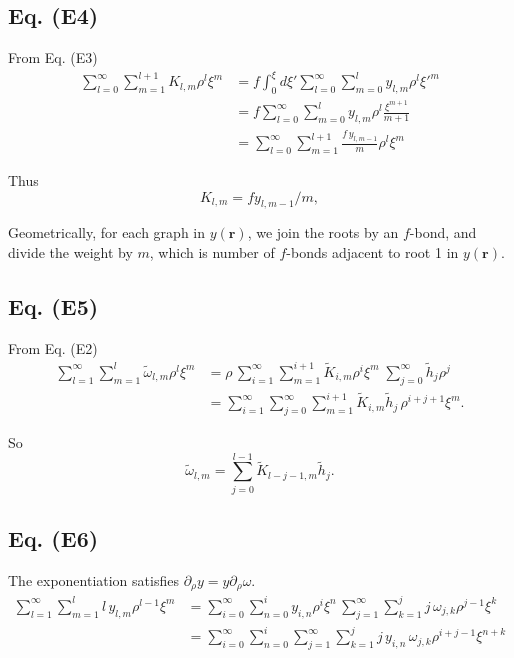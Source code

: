 \documentclass[preprint]{revtex4-1}
\numberwithin{equation}{subsection}
\numberwithin{table}{section}
\newcommand{\vct}[1]{\mathbf{#1}}
\providecommand{\vr}{} %
\renewcommand{\vr}{\vct{r}}
\begin{document}
\subsection{Eq. (E4)}

From Eq. (E3)
\begin{align*}
  \sum_{l=0}^\infty
  \sum_{m=1}^{l+1}
  K_{l,m} \rho^l \xi^m
&=
  f
  \int_0^\xi d\xi'
  \sum_{l=0}^\infty
  \sum_{m=0}^l
  y_{l,m} \rho^l {\xi'}^m
\\
&=
  f
  \sum_{l=0}^\infty
  \sum_{m=0}^l
  y_{l,m} \rho^l \frac{ \xi^{m+1} }{m+1}
\\
&=
  \sum_{l=0}^\infty
  \sum_{m=1}^{l+1}
  \frac{ f \, y_{l,m-1} }{m} \rho^l \xi^{m}
\end{align*}

Thus
\[
  K_{l,m} = f y_{l, m-1}/m,
\]


Geometrically, for each graph in $y(\vr)$,
we join the roots by an $f$-bond,
and divide the weight by $m$,
which is number of $f$-bonds adjacent to root 1
in $y(\vr)$.



\subsection{Eq. (E5)}

From Eq. (E2)
\begin{align*}
  \sum_{l=1}^\infty
  \sum_{m=1}^{l}
  \tilde\omega_{l,m} \rho^l \xi^m
&=
  \rho
  \,
  \sum_{i=1}^\infty
  \sum_{m=1}^{i+1}
  \tilde K_{i,m} \rho^i \xi^m
 \;
  \sum_{j=0}^\infty
  \tilde h_{j} \rho^j
\\
&=
  \sum_{i=1}^\infty
  \sum_{j=0}^\infty
  \sum_{m=1}^{i+1}
  \tilde K_{i,m}
  \tilde h_j
  \, \rho^{i+j+1} \xi^m.
\end{align*}

So
\[
  \tilde \omega_{l,m}
=
  \sum_{j = 0}^{l-1}
  \tilde K_{l - j - 1, m}
  \tilde h_{j}.
\]



\subsection{Eq. (E6)}

The exponentiation satisfies $\partial_\rho y = y \partial_\rho \omega$.
\begin{align*}
\sum_{l = 1}^\infty
\sum_{m = 1}^l
l \, y_{l, m} \rho^{l-1} \xi^m
&=
\sum_{i = 0}^\infty
\sum_{n = 0}^i
y_{i, n} \rho^{i} \xi^n
\,
\sum_{j = 1}^\infty
\sum_{k = 1}^j
j \, \omega_{j, k} \rho^{j-1} \xi^k
\\
&=
\sum_{i = 0}^\infty
\sum_{n = 0}^i
\sum_{j = 1}^\infty
\sum_{k = 1}^j
j \, y_{i, n} \,
\omega_{j, k} \rho^{i+j-1} \xi^{n+k}
\end{align*}
\end{document}
